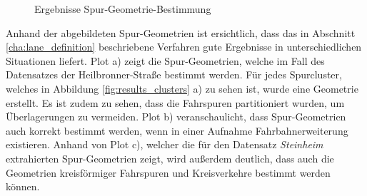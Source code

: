 \begin{figure}[H]
    \centering
    \caption{Ergebnisse Spur-Geometrie-Bestimmung}
    \label{fig:results_laneGeometries}
\end{figure}

Anhand der abgebildeten Spur-Geometrien ist ersichtlich, dass das in Abschnitt \ref{cha:lane_definition}
beschriebene Verfahren gute Ergebnisse in unterschiedlichen Situationen liefert.
Plot a) zeigt die Spur-Geometrien, welche im Fall des Datensatzes der Heilbronner-Straße bestimmt werden.
Für jedes Spurcluster, welches in Abbildung \ref{fig:results_clusters} a) zu sehen ist, wurde eine Geometrie erstellt.
Es ist zudem zu sehen, dass die Fahrspuren partitioniert wurden, um Überlagerungen zu vermeiden.
Plot b) veranschaulicht, dass Spur-Geometrien auch korrekt bestimmt werden, wenn in einer Aufnahme
Fahrbahnerweiterung existieren.
Anhand von Plot c), welcher die für den Datensatz \textit{Steinheim} extrahierten Spur-Geometrien zeigt, wird
außerdem deutlich, dass auch die Geometrien kreisförmiger Fahrspuren und Kreisverkehre bestimmt werden können.

